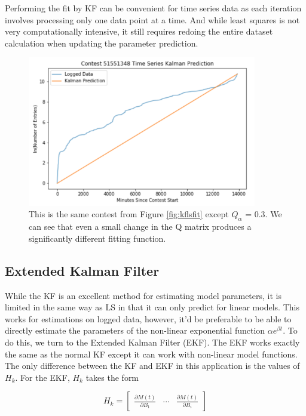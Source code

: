 Performing the fit by KF can be convenient for time series data as each iteration involves processing only one data point at a time. And while least squares is not very computationally intensive, it still requires redoing the entire dataset calculation when updating the parameter prediction.

\begin{figure}[h]
\centering
\includegraphics[width=10cm]{body/methodology/KF_Q3.png}
\caption{This is the same contest from Figure \ref{fig:kflsfit} except $Q_{\alpha}$ = 0.3. We can see that even a small change in the Q matrix produces a significantly different fitting function.}
\label{fig:q03fit}
\end{figure}

\subsection{Extended Kalman Filter}

While the KF is an excellent method for estimating model parameters, it is limited in the same way as LS in that it can only predict for linear models. This works for estimations on logged data, however, it'd be preferable to be able to directly estimate the parameters of the non-linear exponential function $\alpha e^{\beta t}$. To do this, we turn to the Extended Kalman Filter (EKF). The EKF works exactly the same as the normal KF except it can work with non-linear model functions. The only difference between the KF and EKF in this application is the values of $H_{k}$. For the EKF, $H_{k}$ takes the form

\begin{equation}
H_{k} = \begin{bmatrix}
           \frac{\partial M(t)}{\partial B_{1}} & \cdots & \frac{\partial M(t)}{\partial B_{i}}
         \end{bmatrix}
\end{equation}

